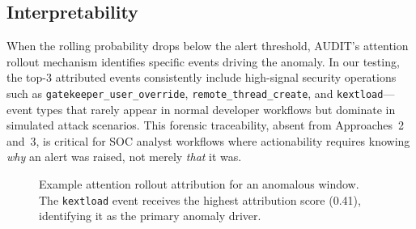 \documentclass[letterpaper,twocolumn,10pt]{article}
\begin{document}
\subsection{Interpretability}

When the rolling probability drops below the alert threshold,
AUDIT's attention rollout mechanism identifies specific events
driving the anomaly.  In our testing, the top-3 attributed events
consistently include high-signal security operations such as
\texttt{gatekeeper\_user\_override},
\texttt{remote\_thread\_create}, and \texttt{kextload}---event
types that rarely appear in normal developer workflows but
dominate in simulated attack scenarios.  This forensic
traceability, absent from Approaches~2 and~3, is critical for
SOC analyst workflows where actionability requires knowing
\emph{why} an alert was raised, not merely \emph{that} it was.

\begin{figure}[t]
\centering
{}
\caption{Example attention rollout attribution for an anomalous
window.  The \texttt{kextload} event receives the highest
attribution score (0.41), identifying it as the primary anomaly
driver.}
\label{fig:attention_heatmap}
\end{figure}


\end{document}
